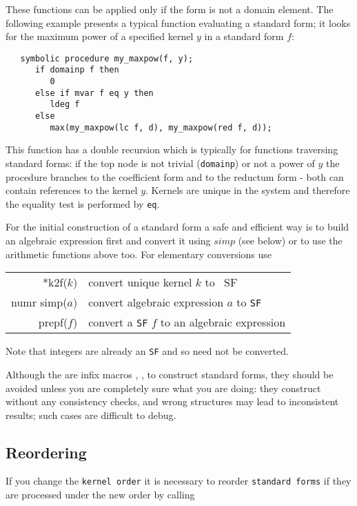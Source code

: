 \documentclass[11pt]{article}
\makeatletter
\newcommand{\ttindex}[1]{\index{#1@{\texttt{#1}}}}
\makeatother
\begin{document}
These functions can be applied only if the form
is not a domain element. The following example presents
a typical function evaluating a standard form; it looks for the
maximum power of a specified kernel $y$ in a standard form $f$:

\begin{verbatim}
   symbolic procedure my_maxpow(f, y);
      if domainp f then
         0
      else if mvar f eq y then
         ldeg f
      else
         max(my_maxpow(lc f, d), my_maxpow(red f, d));
\end{verbatim}

This function has a double recursion which is typically
for functions traversing standard forms: if the top node is
not trivial (\texttt{domainp}) or not a power of $y$
the procedure branches to the
coefficient form and to the reductum form - both
can contain references to the kernel $y$. Kernels are
unique in the system and therefore the equality test is
performed by \texttt{eq}.

For the initial construction of a standard form a safe and efficient
way is to build an algebraic expression first and convert
it using $simp$ (see below) or to use the arithmetic functions
above too. For elementary conversions use

\begin{center}
\begin{tabular}{|r|l|} \hline
    *k2f($k$)      &  convert unique kernel $k$ to {\ SF} \\
    numr simp($a$) & convert algebraic expression $a$ to \texttt{SF}\\
    prepf($f$)     & convert a \texttt{SF} $f$ to an algebraic expression\\
\hline
\end{tabular}
\end{center}
Note that integers are already an \texttt{SF} and so need not be converted.

Although the are infix macros  ,  ,  to
construct standard forms, they should be avoided unless
you are completely sure what you are doing: they construct
without any consistency checks, and wrong structures may lead
to inconsistent results; such cases are difficult to debug.

\subsection{Reordering}

If you change the \texttt{kernel order}\ttindex{kernel order} it is
necessary to reorder \texttt{standard forms} if they
are processed under the new order by calling
\end{document}
